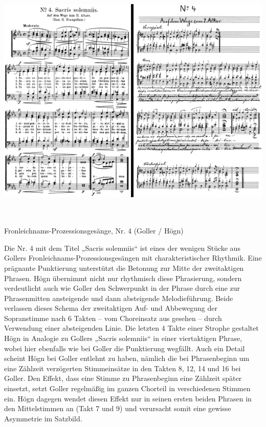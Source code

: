 \includegraphics[width=15.967cm,height=11.947cm]{pictures/zulassungsarbeit-img083.png}

\begin{figure}
\img{}
\caption{}
\end{figure}

Fronleichnams-Prozessionsgesänge, Nr. 4
(Goller / Högn)

Die Nr. 4 mit dem Titel „Sacris solemniis“ ist eines der wenigen Stücke
aus Gollers Fronleichnams-Prozessionsgesängen mit charakteristischer
Rhythmik. Eine prägnante Punktierung unterstützt die Betonung zur Mitte
der zweitaktigen Phrasen. Högn übernimmt nicht nur rhythmisch diese
Phrasierung, sondern verdeutlicht auch wie Goller den Schwerpunkt in
der Phrase durch eine zur Phrasenmitten ansteigende und dann
absteigende Melodieführung. Beide verlassen dieses Schema der
zweitaktigen Auf- und Abbewegung der Sopranstimme nach 6 Takten – vom
Choreinsatz aus gesehen – durch Verwendung einer absteigenden Linie.
Die letzten 4 Takte einer Strophe gestaltet Högn in Analogie zu Gollers
„Sacris solemniis“ in einer viertaktigen Phrase, wobei hier ebenfalls
wie bei Goller die Punktierung wegfällt. Auch ein Detail scheint Högn
bei Goller entlehnt zu haben, nämlich die bei Phrasenbeginn um eine
Zählzeit verzögerten Stimmeinsätze in den Takten 8, 12, 14 und 16 bei
Goller. Den Effekt, dass eine Stimme zu Phrasenbeginn eine Zählzeit
später einsetzt, setzt Goller regelmäßig im ganzen Chorteil in
verschiedenen Stimmen ein. Högn dagegen wendet diesen Effekt nur in
seinen ersten beiden Phrasen in den Mittelstimmen an (Takt 7 und 9) und
verursacht somit eine gewisse Asymmetrie im Satzbild.


